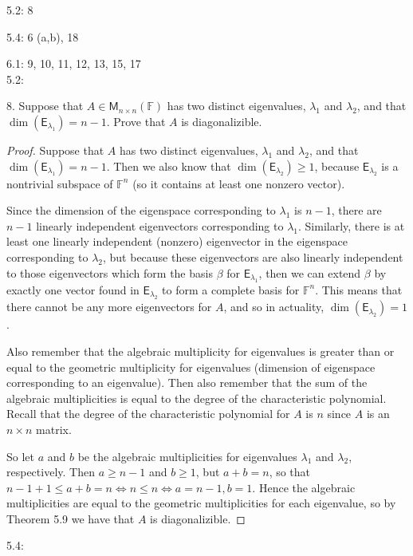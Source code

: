 \documentclass[11pt]{article}
\begin{document}
5.2: 8

5.4: 6 (a,b), 18

6.1: 9, 10, 11, 12, 13, 15, 17 \\

5.2:

8. Suppose that $A\in\mathsf{M}_{n\times n}(\mathbb{F})$ has two distinct eigenvalues, $\lambda_1$ and $\lambda_2$, and that $\dim(\mathsf{E}_{\lambda_1}) = n-1$. Prove that $A$ is diagonalizible.

\begin{proof}
  Suppose that $A$ has two distinct eigenvalues, $\lambda_1$ and $\lambda_2$, and that $\dim(\mathsf{E}_{\lambda_1}) = n-1$. Then we also know that $\dim(\mathsf{E}_{\lambda_2}) \geq 1$, because $\mathsf{E}_{\lambda_2}$ is a nontrivial subspace of $\mathbb{F}^n$ (so it contains at least one nonzero vector). 
  
  Since the dimension of the eigenspace corresponding to $\lambda_1$ is $n-1$, there are $n-1$ linearly independent eigenvectors corresponding to $\lambda_1$. Similarly, there is at least one linearly independent (nonzero) eigenvector in the eigenspace corresponding to $\lambda_2$, but because these eigenvectors are also linearly independent to those eigenvectors which form the basis $\beta$ for $\mathsf{E}_{\lambda_1}$, then we can extend $\beta$ by exactly one vector found in $\mathsf{E}_{\lambda_2}$ to form a complete basis for $\mathbb{F}^n$. This means that there cannot be any more eigenvectors for $A$, and so in actuality, $\dim(\mathsf{E}_{\lambda_2}) = 1$.

  Also remember that the algebraic multiplicity for eigenvalues is greater than or equal to the geometric multiplicity for eigenvalues (dimension of eigenspace corresponding to an eigenvalue). Then also remember that the sum of the algebraic multiplicities is equal to the degree of the characteristic polynomial. Recall that the degree of the characteristic polynomial for $A$ is $n$ since $A$ is an $n\times n$ matrix. 

  So let $a$ and $b$ be the algebraic multiplicities for eigenvalues $\lambda_1$ and $\lambda_2$, respectively. Then $a\geq n-1$ and $b\geq 1$, but $a+b = n$, so that $n-1 + 1 \leq a+b = n \iff n \leq n \iff a=n-1, b=1$. Hence the algebraic multiplicities are equal to the geometric multiplicities for each eigenvalue, so by Theorem 5.9 we have that $A$ is diagonalizible.
\end{proof}

5.4:
\end{document}
